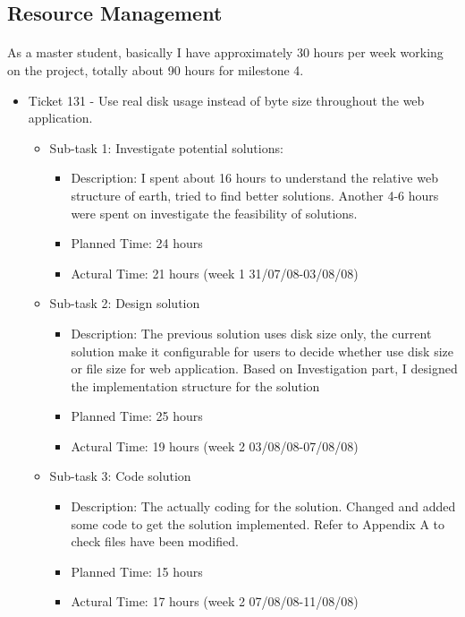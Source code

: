 \documentclass[oneside, 10pt, a4]{article}
\begin{document}
\subsection*{Resource Management}

\paragraph{}
As a master student, basically I have approximately 30 hours per week working on the project, totally about 90 hours for milestone 4.
\begin{itemize}
 \item Ticket 131 - Use real disk usage instead of byte size throughout the web application.
	\begin{itemize}
	\item Sub-task 1: Investigate potential solutions:
			\begin{itemize}
			\item Description: I spent about 16 hours to understand the relative web structure of earth, tried to find better solutions. Another 4-6 hours were spent on investigate the feasibility of solutions.
			\item Planned Time: 24 hours
			\item Actural Time: 21 hours (week 1 31/07/08-03/08/08)
			\end{itemize}
		\item Sub-task 2: Design solution
			\begin{itemize}
			\item Description: The previous solution uses disk size only, the current solution make it configurable for users to decide whether use disk size or file size for web application. Based on Investigation part, I designed the implementation structure for the solution
			\item Planned Time: 25 hours
			\item Actural Time: 19 hours (week 2 03/08/08-07/08/08)
			\end{itemize}
		\item Sub-task 3: Code solution
			\begin{itemize}
			\item Description: The actually coding for the solution. Changed and added some code to get the solution implemented. Refer to Appendix A to check files have been modified.
			\item Planned Time: 15 hours
			\item Actural Time: 17 hours (week 2 07/08/08-11/08/08)

\end{itemize}
\end{itemize}
\end{itemize}
\end{document}
